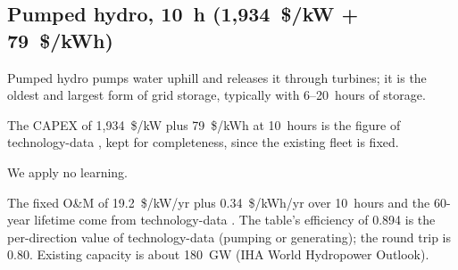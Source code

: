 \subsection{Pumped hydro, 10~h (1,934~\$/kW + 79~\$/kWh)}\label{sec:PHS}
Pumped hydro pumps water uphill and releases it through turbines;
it is the oldest and largest form of grid storage, typically with 6--20~hours of storage.

The CAPEX of 1,934~\$/kW plus 79~\$/kWh at 10~hours is the figure of technology-data \citep{technologydata}, kept for completeness, since the existing fleet is fixed.

We apply no learning.

The fixed O\&M of 19.2~\$/kW/yr plus 0.34~\$/kWh/yr over 10~hours and the 60-year lifetime come from technology-data \citep{technologydata}.
The table's efficiency of 0.894 is the per-direction value of technology-data \citep{technologydata} (pumping or generating); the round trip is 0.80.
Existing capacity is about 180~GW (IHA World Hydropower Outlook).
